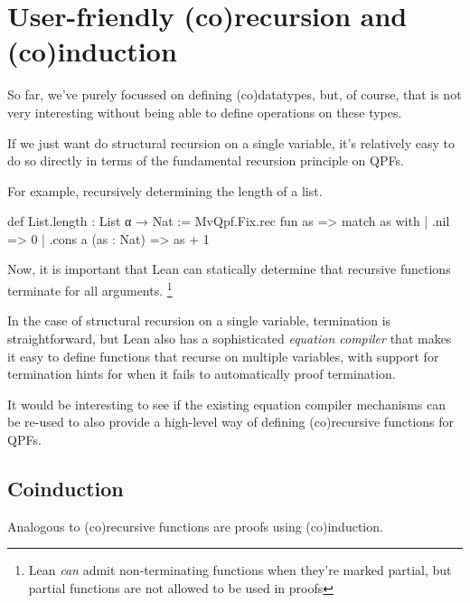 \documentclass[titlepage]{report}
\begin{document}
\section{User-friendly (co)recursion and (co)induction}
So far, we've purely focussed on defining (co)datatypes, but, of course, that is not very interesting
without being able to define operations on these types.

If we just want do structural recursion on a single variable, it's relatively easy to do so directly
in terms of the fundamental recursion principle on QPFs.

For example, recursively determining the length of a list.
\begin{leancode}
def List.length : List α → Nat :=
  MvQpf.Fix.rec fun as => match as with
    | .nil                => 0
    | .cons a (as : Nat)  => as + 1 
\end{leancode}

Now, it is important that Lean can statically determine that recursive functions terminate for all 
arguments. \footnote{Lean \emph{can} admit non-terminating functions when they're marked partial, but partial functions are not allowed to be used in proofs}

In the case of structural recursion on a single variable, termination is straightforward, but Lean
also has a sophisticated \emph{equation compiler} that makes it easy to define functions that recurse
on multiple variables, with support for termination hints for when it fails to automatically proof
termination.

It would be interesting to see if the existing equation compiler mechanisms can be re-used
to also provide a high-level way of defining (co)recursive functions for QPFs.

\subsection*{Coinduction}

Analogous to (co)recursive functions are proofs using (co)induction.
\end{document}
